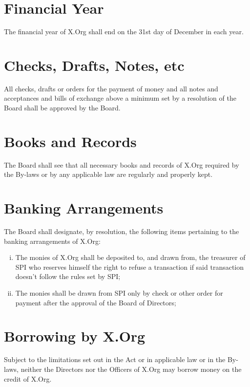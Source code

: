 \documentclass[10pt, english]{xorgdocs}
\begin{document}

\section{Financial Year}
The financial year of X.Org shall end on the 31st day of December in each year.

\section{Checks, Drafts, Notes, etc}
All checks, drafts or orders for the payment of money and all notes and
acceptances
and bills of exchange above a minimum set by a resolution of the Board shall be
approved by the Board.

\section{Books and Records}
The Board shall see that all necessary books and records of X.Org required by
the By-laws or by any applicable law are regularly and properly kept.

\section{Banking Arrangements}
The Board shall designate, by resolution, the following items pertaining to the
banking arrangements of X.Org:

\begin{enumerate}[(i)\hspace{.2cm}]
	\item The monies of X.Org shall be deposited to, and drawn from, the
	treasurer of SPI who reserves himself the right to refuse a transaction
	if said transaction doesn't follow the rules set by SPI;

	\item The monies shall be drawn from SPI only by check or other order
	for payment after the approval of the Board of Directors;
\end{enumerate}

\section{Borrowing by X.Org}
Subject to the limitations set out in the Act or in applicable law or in the
By-laws, neither the Directors nor the Officers of X.Org may borrow money on the
credit of X.Org.
\end{document}
